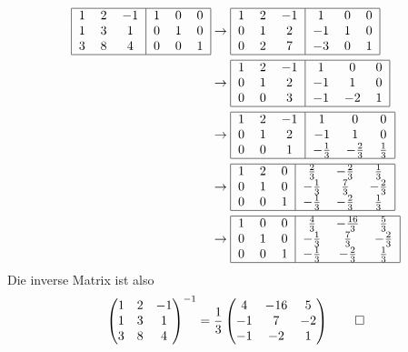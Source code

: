 \begin{loesung}
\begin{teilaufgaben}
\item
\begin{align*}
\begin{tabular}{|ccc|ccc|}
\hline
1&2&$-1$&1&0&0\\
1&3&1&0&1&0\\
3&8&4&0&0&1\\
\hline
\end{tabular}
&
\rightarrow
\begin{tabular}{|ccc|ccc|}
\hline
1&2&$-1$&1&0&0\\
0&1&2&$-1$&1&0\\
0&2&7&$-3$&0&1\\
\hline
\end{tabular}
\\
&\rightarrow
\begin{tabular}{|ccc|ccc|}
\hline
1&2&$-1$&1&0&0\\
0&1&2&$-1$&1&0\\
0&0&3&$-1$&$-2$&1\\
\hline
\end{tabular}
\\
&\rightarrow
\begin{tabular}{|ccc|ccc|}
\hline
1&2&$-1$&1&0&0\\
0&1&2&$-1$&1&0\\
0&0&1&$-\frac13$&$-\frac23$&$\frac13$\\
\hline
\end{tabular}
\\
&\rightarrow
\begin{tabular}{|ccc|ccc|}
\hline
1&2&0&$\frac23$&$-\frac23$&$\frac13$\\
0&1&0&$-\frac13$&$\frac73$&$-\frac23$\\
0&0&1&$-\frac13$&$-\frac23$&$\frac13$\\
\hline
\end{tabular}
\\
&\rightarrow
\begin{tabular}{|ccc|ccc|}
\hline
1&0&0&$\frac43$&$-\frac{16}3$&$\frac53$\\
0&1&0&$-\frac13$&$\frac73$&$-\frac23$\\
0&0&1&$-\frac13$&$-\frac23$&$\frac13$\\
\hline
\end{tabular}
\end{align*}
Die inverse Matrix ist also
\[
\begin{pmatrix}
1&2&-1\\
1&3&1\\
3&8&4
\end{pmatrix}^{-1}
=
\frac13
\begin{pmatrix}
4&-16&5\\
-1&7&-2\\
-1&-2&1
\end{pmatrix}
\qedhere
\]
\end{teilaufgaben}
\end{loesung}

